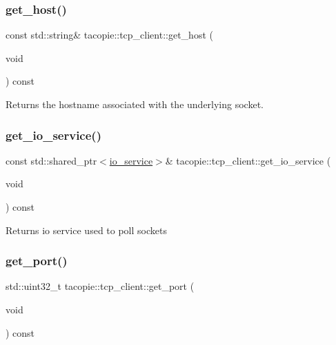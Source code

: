 \subsubsection{\texorpdfstring{get\+\_\+host()}{get\_host()}}
{\footnotesize\ttfamily const std\+::string\& tacopie\+::tcp\+\_\+client\+::get\+\_\+host (\begin{DoxyParamCaption}\item[{void}]{ }\end{DoxyParamCaption}) const}

\begin{DoxyReturn}{Returns}
the hostname associated with the underlying socket. 
\end{DoxyReturn}
\mbox{\label{classtacopie_1_1tcp__client_ae1a9fc6cbbd500b382a5e43c48471964}} 
\subsubsection{\texorpdfstring{get\+\_\+io\+\_\+service()}{get\_io\_service()}}
{\footnotesize\ttfamily const std\+::shared\+\_\+ptr$<$\hyperlink{classtacopie_1_1io__service}{io\+\_\+service}$>$\& tacopie\+::tcp\+\_\+client\+::get\+\_\+io\+\_\+service (\begin{DoxyParamCaption}\item[{void}]{ }\end{DoxyParamCaption}) const}

\begin{DoxyReturn}{Returns}
io service used to poll sockets 
\end{DoxyReturn}
\mbox{\label{classtacopie_1_1tcp__client_a3b42ae2afe6d5ee5f2f16b8bd7846f37}} 
\subsubsection{\texorpdfstring{get\+\_\+port()}{get\_port()}}
{\footnotesize\ttfamily std\+::uint32\+\_\+t tacopie\+::tcp\+\_\+client\+::get\+\_\+port (\begin{DoxyParamCaption}\item[{void}]{ }\end{DoxyParamCaption}) const}

